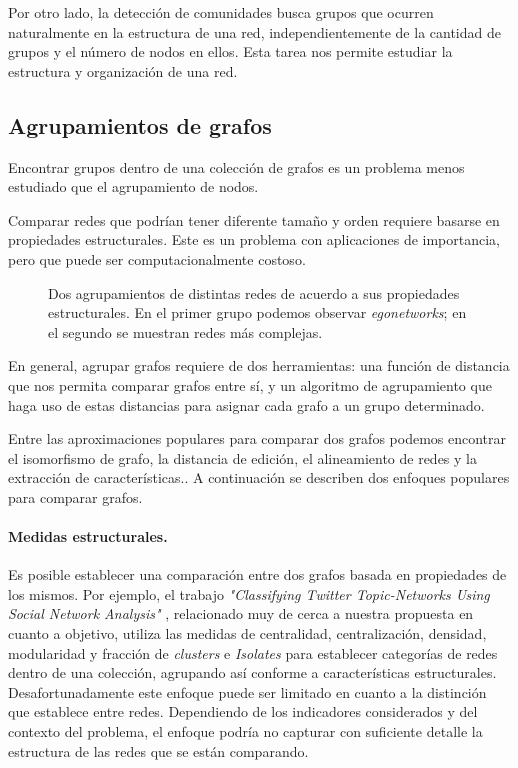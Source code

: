 Por otro lado, la detección de comunidades busca grupos que ocurren naturalmente en la estructura de una red, independientemente de la cantidad de grupos y el número de nodos en ellos. Esta tarea nos permite estudiar la estructura y organización de una red. 

\subsection{Agrupamientos de grafos}
Encontrar grupos dentro de una colección de grafos es un problema menos estudiado que el agrupamiento de nodos. 

Comparar redes que podrían tener diferente tamaño y orden requiere basarse en propiedades estructurales. Este es un problema con aplicaciones de importancia, pero que puede ser computacionalmente costoso. 

 \begin{figure}[htbp]
   \centering
   
    \caption{Dos agrupamientos de distintas redes de acuerdo a sus propiedades estructurales. En el primer grupo podemos observar {\it egonetworks}; en el segundo se muestran redes más complejas.}
    \label{fig:netcluster}
\end{figure}

En general, agrupar grafos requiere de dos herramientas: una función de distancia que nos permita comparar grafos entre sí, y un algoritmo de agrupamiento que haga uso de estas distancias para asignar cada grafo a un grupo determinado. 

Entre las aproximaciones populares para comparar dos grafos podemos encontrar el isomorfismo de grafo, la distancia de edición, el alineamiento de redes y la extracción de características.\cite{saxena_identifying_2019}. A continuación se describen dos enfoques populares para comparar grafos. 


\paragraph{Medidas estructurales.} Es posible establecer una comparación entre dos grafos basada en propiedades de los mismos. Por ejemplo, el trabajo \textit{"Classifying Twitter Topic-Networks Using Social Network Analysis"} \cite{himelboim_classifying_2017}, relacionado muy de cerca a nuestra propuesta en cuanto a objetivo, utiliza las medidas de centralidad, centralización, densidad, modularidad y fracción de \textit{clusters} e \textit{Isolates} para establecer categorías de redes dentro de una colección, agrupando así conforme a características estructurales. Desafortunadamente este enfoque puede ser limitado en cuanto a la distinción que establece entre redes. Dependiendo de los indicadores considerados y del contexto del problema, el enfoque podría no capturar con suficiente detalle la estructura de las redes que se están comparando. 


